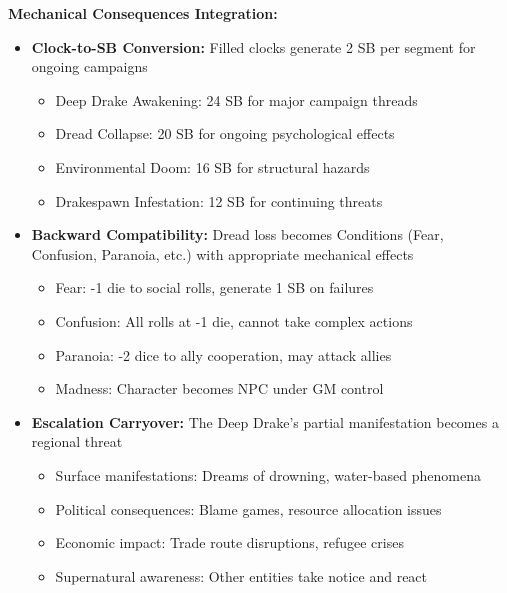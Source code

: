 \documentclass[11pt]{article}
\begin{document}
\begin{itemize}
\begin{itemize}
\begin{itemize}
\begin{itemize}
\textbf{Mechanical Consequences Integration:} \begin{itemize} \item \textbf{Clock-to-SB Conversion:} Filled clocks generate 2 SB per segment for ongoing campaigns \begin{itemize} \item Deep Drake Awakening: 24 SB for major campaign threads \item Dread Collapse: 20 SB for ongoing psychological effects \item Environmental Doom: 16 SB for structural hazards \item Drakespawn Infestation: 12 SB for continuing threats \end{itemize} \item \textbf{Backward Compatibility:} Dread loss becomes Conditions (Fear, Confusion, Paranoia, etc.) with appropriate mechanical effects \begin{itemize} \item Fear: -1 die to social rolls, generate 1 SB on failures \item Confusion: All rolls at -1 die, cannot take complex actions \item Paranoia: -2 dice to ally cooperation, may attack allies \item Madness: Character becomes NPC under GM control \end{itemize} \item \textbf{Escalation Carryover:} The Deep Drake's partial manifestation becomes a regional threat \begin{itemize} \item Surface manifestations: Dreams of drowning, water-based phenomena \item Political consequences: Blame games, resource allocation issues \item Economic impact: Trade route disruptions, refugee crises \item Supernatural awareness: Other entities take notice and react \end{itemize} \end{itemize}


\end{itemize}
\end{itemize}
\end{itemize}
\end{itemize}
\end{document}
